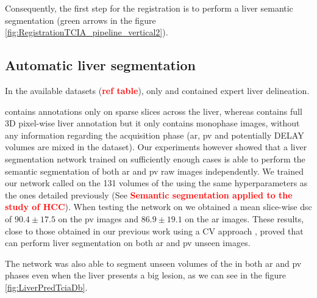 Consequently, the first step for the  registration is to perform a
liver semantic segmentation (green arrows in the figure \ref{fig:RegistrationTCIA_pipeline_vertical2}).

\subsection{Automatic liver
segmentation}\label{tcia-db-unsupervised-liver-segmentation}

In the available datasets (\textcolor{red}{\textbf{ref table}}), only  and
 contained expert liver delineation.

 contains annotations only on sparse slices across the liver,
whereas  contains full 3D pixel-wise liver annotation but it only
contains monophase images, without any information regarding the
acquisition phase (\ac{ar}, \ac{pv} and potentially DELAY volumes are mixed in the dataset).
Our experiments however showed that a liver segmentation network trained
on sufficiently enough cases is able to perform the semantic
segmentation of both \ac{ar} and \ac{pv} raw images independently.
We trained our network called  on the 131 volumes of the
 using the same hyperparameters as the ones detailed
previously (See \textcolor{red}{\textbf{Semantic segmentation applied to the study of HCC}}). When testing the  network on  we
obtained a mean slice-wise \ac{dsc} of $ 90.4 \pm 17.5 $ on the \ac{pv} images and
$ 86.9 \pm 19.1 $ on the \ac{ar} images. These results, close to those obtained
in our previous work using a CV approach \cite{Ouhmich2019}, proved that  can
perform liver segmentation on both \ac{ar} and \ac{pv} unseen images.

The  network was also able to segment unseen volumes of the
 in both \ac{ar} and \ac{pv} phases even when the liver presents a big
lesion, as we can see in the figure \ref{fig:LiverPredTciaDb}.


